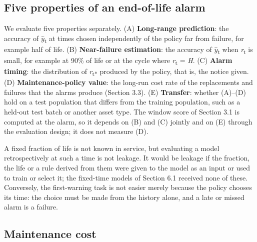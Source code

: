 \documentclass[a4paper,fleqn,doubleblind]{cas-dc}
\begin{document}
\subsection{Five properties of an end-of-life alarm}

We evaluate five properties separately. (A) \textbf{Long-range prediction}: the accuracy of $\hat{y}$\textsubscript{t} at times chosen independently of the policy far from failure, for example half of life. (B) \textbf{Near-failure estimation}: the accuracy of $\hat{y}$\textsubscript{t} when \textit{r}\textsubscript{t} is small, for example at 90\% of life or at the cycle where \textit{r}\textsubscript{t} = \textit{H}. (C) \textbf{Alarm timing}: the distribution of \textit{r}\textsubscript{t*} produced by the policy, that is, the notice given. (D) \textbf{Maintenance-policy value}: the long-run cost rate of the replacements and failures that the alarms produce (Section 3.3). (E) \textbf{Transfer}: whether (A)--(D) hold on a test population that differs from the training population, such as a held-out test batch or another asset type. The window score of Section 3.1 is computed at the alarm, so it depends on (B) and (C) jointly and on (E) through the evaluation design; it does not measure (D).

A fixed fraction of life is not known in service, but evaluating a model retrospectively at such a time is not leakage. It would be leakage if the fraction, the life or a rule derived from them were given to the model as an input or used to train or select it; the fixed-time models of Section 6.1 received none of these. Conversely, the first-warning task is not easier merely because the policy chooses its time: the choice must be made from the history alone, and a late or missed alarm is a failure.

\subsection{Maintenance cost}
\end{document}
